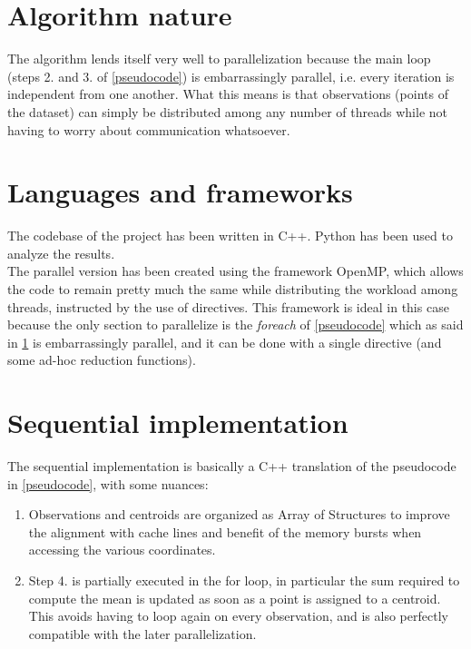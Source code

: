 \documentclass[10pt,twocolumn,letterpaper]{article}
\begin{document}
\section{Algorithm nature} \label{nature}
The algorithm lends itself very well to parallelization because the main loop (steps 2. and 3. of \cref{pseudocode}) is embarrassingly parallel, i.e. every iteration is independent from one another. What this means is that observations (points of the dataset) can simply be distributed among any number of threads while not having to worry about communication whatsoever.

\section{Languages and frameworks}
The codebase of the project has been written in C++. Python has been used to analyze the results.\\
The parallel version has been created using the framework OpenMP, which allows the code to remain pretty much the same while distributing the workload among threads, instructed by the use of directives. This framework is ideal in this case because the only section to parallelize is the \textit{foreach} of \cref{pseudocode} which as said in \cref{nature} is embarrassingly parallel, and it can be done with a single directive (and some ad-hoc reduction functions).

\section{Sequential implementation} \label{seq_imp}
The sequential implementation is basically a C++ translation of the pseudocode in \cref{pseudocode}, with some nuances: 
\begin{enumerate}
	\item Observations and centroids are organized as Array of Structures to improve the alignment with cache lines and benefit of the memory bursts when accessing the various coordinates.
	\item Step 4. is partially executed in the for loop, in particular the sum required to compute the mean is updated as soon as a point is assigned to a centroid. This avoids having to loop again on every observation, and is also perfectly compatible with the later parallelization.
\end{enumerate}
\end{document}
